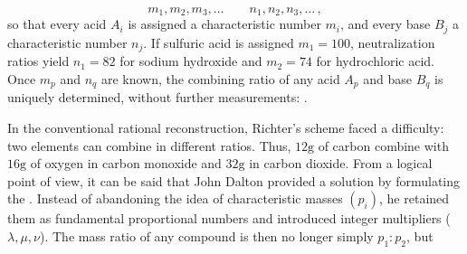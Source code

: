 \documentclass[submitted,12pt]{article}
\providecommand{\DIFaddbegin}{} %
\providecommand{\DIFaddend}{} %
\providecommand{\DIFdelbegin}{} %
\providecommand{\DIFdelend}{} %
\begin{document}
\begin{equation*}
m_1, m_2, m_3, \ldots \qquad n_1, n_2, n_3, \ldots\,,
\end{equation*}
%
so that every acid $A_i$ is assigned a characteristic number $m_i$, and every base $B_j$ a characteristic number $n_j$. If sulfuric acid is assigned $m_1=100$, neutralization ratios yield $n_1=82$ for sodium hydroxide and $m_2=74$ for hydrochloric acid. Once $m_p$ and $n_q$ are known, the combining ratio of any acid $A_p$ and base $B_q$ is uniquely determined, without further measurements: \DIFdelbegin %
\DIFdelend \DIFaddbegin {} \DIFaddend {}.

In the conventional rational reconstruction, Richter's scheme faced a difficulty: two elements can combine in different ratios. Thus, $12\text{g}$ of carbon combine with $16\text{g}$ of oxygen in carbon monoxide and $32\text{g}$ in carbon dioxide. From a logical point of view, it can be said that John Dalton provided a solution by formulating the . Instead of abandoning the idea of characteristic masses $\left(p_i\right)$, he retained them as fundamental proportional numbers and introduced integer multipliers ($\lambda, \mu, \nu$). The mass ratio of any compound is then no longer simply $p_1: p_2$, but
\end{document}
